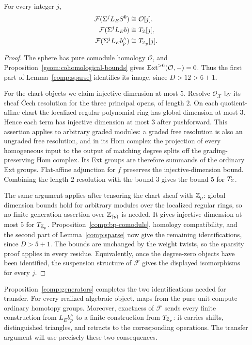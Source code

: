 \begin{proposition}
For every integer $j$,\label{comp:generators}
\[
 \begin{split}
 \mathcal F(\Sigma^jL_ES^0)&\cong\mathcal O[j],\\
 \mathcal F(\Sigma^jL_Eb)&\cong T_{\mathbb Z}[j],\\
 \mathcal F(\Sigma^jL_Eb_p^\wedge)&\cong T_{\mathbb Z_p}[j].
 \end{split}
\]
\end{proposition}

\begin{proof}
The sphere has pure comodule homology $\mathcal O$, and
Proposition~\ref{geom:cohomological-bounds} gives
$\operatorname{Ext}^{>6}(\mathcal O,-)=0$. Thus the first part of
Lemma~\ref{comp:sparse} identifies its image, since $D>12>6+1$.

For the chart objects we claim injective dimension at most $5$.
Resolve $\mathcal O_{\mathcal X}$ by its sheaf \v{C}ech resolution for
the three principal opens, of length $2$. On each quotient-affine
chart the localized regular polynomial ring has global dimension
at most $3$. Hence each term has injective dimension at most $3$
after pushforward. This assertion applies to arbitrary graded
modules: a graded free resolution is also an ungraded free
resolution, and in its Hom complex the projection of every
homogeneous input to the output of matching degree splits off the
grading-preserving Hom complex. Its Ext groups are therefore
summands of the ordinary Ext groups. Flat-affine adjunction for $f$
preserves the injective-dimension bound. Combining the length-$2$
resolution with the bound $3$ gives the bound $5$ for $T_{\mathbb Z}$.

The same argument applies after tensoring the chart sheaf with
$\mathbb Z_p$: global dimension bounds hold for arbitrary modules over
the localized regular rings, so no finite-generation assertion over
$\mathbb Z_{(p)}$ is needed. It gives injective dimension at most $5$ for
$T_{\mathbb Z_p}$. Proposition~\ref{comp:bp-comodule}, homology
compatibility, and the second part of Lemma~\ref{comp:sparse}
now give the remaining identifications, since $D>5+1$. The bounds
are unchanged by the weight twists, so the sparsity proof applies in
every residue. Equivalently, once the degree-zero objects have been
identified, the suspension structure of $\mathcal F$ gives the
displayed isomorphisms for every $j$.
\end{proof}

Proposition~\ref{comp:generators} completes the two identifications
needed for transfer. For every realized algebraic object, maps from
the pure unit compute ordinary homotopy groups. Moreover, exactness of
$\mathcal F$ sends every finite construction from $L_Eb_p^\wedge$
to a finite construction from $T_{\mathbb Z_p}$: it carries shifts,
distinguished triangles, and retracts to the corresponding operations. The transfer
argument will use precisely these two consequences.

